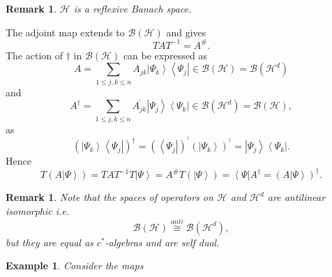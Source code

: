 \documentclass[aps,preprint]{revtex4}%
\newtheorem{example}[theorem]{Example}
\newtheorem{remark}[theorem]{Remark}
\begin{document}
\begin{remark}
$\mathcal{H}$ is a reflexive Banach space.
\end{remark}

The adjoint map extends to $\mathcal{B}\left(  \mathcal{H}\right)  $ and
gives
\begin{equation}
TAT^{-1}=A^{\#}.
\end{equation}
The action of $\dagger$ in $\mathcal{B}\left(  \mathcal{H}\right)  $ can be
expressed as
\begin{equation}
A=\sum_{1\leq j,k\leq n}A_{jk}\left\vert \Psi_{k}\right\rangle \left\langle
\Psi_{j}\right\vert \in\mathcal{B}\left(  \mathcal{H}\right)  =\mathcal{B}%
\left(  \mathcal{H}^{d}\right)
\end{equation}
and
\begin{equation}
A^{\dagger}=\sum_{1\leq j,k\leq n}\overline{A_{jk}}\left\vert \Psi
_{j}\right\rangle \left\langle \Psi_{k}\right\vert \in\mathcal{B}\left(
\mathcal{H}^{d}\right)  =\mathcal{B}\left(  \mathcal{H}\right)  ,
\end{equation}
as
\begin{equation}
\left(  \left\vert \Psi_{k}\right\rangle \left\langle \Psi_{j}\right\vert
\right)  ^{\dagger}=\left(  \left\langle \Psi_{j}\right\vert \right)
^{^{\dagger}}\left(  \left\vert \Psi_{k}\right\rangle \right)  ^{^{\dagger}%
}=\left\vert \Psi_{j}\right\rangle \left\langle \Psi_{k}\right\vert .
\end{equation}
Hence
\begin{equation}
T\left(  A\left\vert \Psi\right\rangle \right)  =TAT^{-1}T\left\vert
\Psi\right\rangle =A^{\#}T\left(  \left\vert \Psi\right\rangle \right)
=\left\langle \Psi\right\vert A^{\dagger}=\left(  A\left\vert \Psi
\right\rangle \right)  ^{\dagger}.
\end{equation}


\begin{remark}
\emph{Note that the spaces of operators on }$\mathcal{H}$ and $\mathcal{H}%
^{d}$ are antilinear isomorphic i.e. \emph{ }
\begin{equation}
\mathcal{B}\left(  \mathcal{H}\right)  \overset{anti}{\mathcal{\cong}%
}\mathcal{B}\left(  \mathcal{H}^{d}\right)  ,
\end{equation}
but they are \emph{equal as }$c^{\ast}$-algebras and are self dual.
\end{remark}

\begin{example}
Consider the maps
\end{example}
\end{document}
